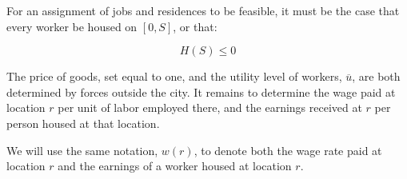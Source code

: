 For an assignment of jobs and residences to be feasible, it must be the case that every worker be housed on $[0, S]$, or that:

\begin{equation}
    H(S) \leq 0
\end{equation}

The price of goods, set equal to one, and the utility level of workers, $\overline{u}$, are both determined by forces outside the city. It remains to determine the wage paid at location $r$ per unit of labor employed there, and the earnings received at $r$ per person housed at that location.

We will use the same notation, $w(r)$, to denote both the wage rate paid at location $r$ and the earnings of a worker housed at location $r$.